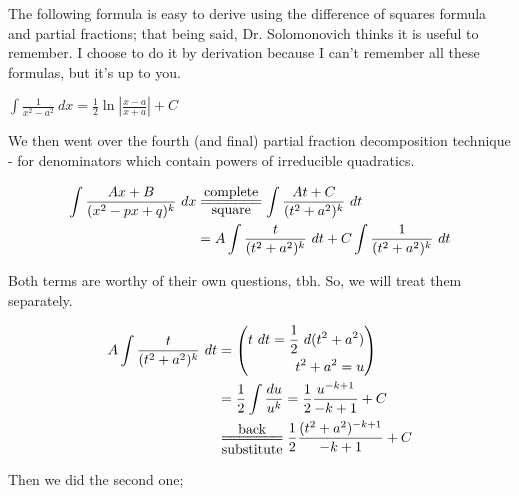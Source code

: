 \documentclass{article}
\begin{document}
The following formula is easy to derive using the difference of squares formula and partial fractions; that being said, Dr. Solomonovich thinks it is useful to remember. I choose to do it by derivation because I can't remember all these formulas, but it's up to you.

\begin{center}
$\displaystyle\boxed{\int\frac{1}{x^2-a^2}\ dx=\frac{1}{2}\ln\left|\frac{x-a}{x+a}\right|+C}$
\end{center}

\vspace{10pt}

We then went over the fourth (and final) partial fraction decomposition technique - for denominators which contain powers of irreducible quadratics.

\begin{align*}
\int\frac{Ax+B}{(x^2-px+q)^k}\ dx&\overset{\mbox{complete}}{\underset{\mbox{square}}{=\joinrel=\joinrel=\joinrel=\joinrel=\joinrel=\joinrel=}}\int\frac{At+C}{(t^2+a^2)^k}\ dt\\
&=A\int\frac{t}{(t^2+a^2)^k}\ dt+C\int\frac{1}{(t^2+a^2)^k}\ dt\\
\end{align*}

\vspace{10pt}

Both terms are worthy of their own questions, tbh. So, we will treat them separately.

\begin{align*}
A\int\frac{t}{(t^2+a^2)^k}\ dt&=\left(\begin{aligned}t\ dt=\frac{1}{2}\ d(t^2+a^2)\\t^2+a^2=u\end{aligned}\right)\\
&=\frac{1}{2}\int\frac{du}{u^k}=\frac{1}{2}\frac{u^{-k+1}}{-k+1}+C\\
&\overset{\mbox{back}}{\underset{\mbox{substitute}}{=\joinrel=\joinrel=\joinrel=\joinrel=\joinrel=\joinrel=}}\frac{1}{2}\frac{(t^2+a^2)^{-k+1}}{-k+1}+C
\end{align*}

\vspace{10pt}

Then we did the second one;
\end{document}
